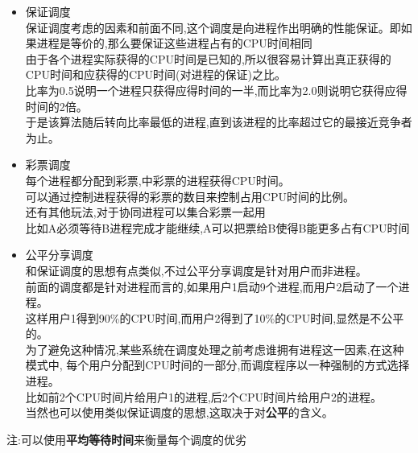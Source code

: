 \documentclass[UTF8,a4paper]{ctexart}
\begin{document}
\begin{itemize}
      \item 保证调度\\
      保证调度考虑的因素和前面不同,这个调度是向进程作出明确的性能保证。即如果进程是等价的,那么要保证这些进程占有的CPU时间相同\\
      由于各个进程实际获得的CPU时间是已知的,所以很容易计算出真正获得的CPU时间和应获得的CPU时间(对进程的保证)之比。\\
      比率为0.5说明一个进程只获得应得时间的一半,而比率为2.0则说明它获得应得时间的2倍。\\
      于是该算法随后转向比率最低的进程,直到该进程的比率超过它的最接近竞争者为止。

      \item 彩票调度\\
      每个进程都分配到彩票,中彩票的进程获得CPU时间。\\
      可以通过控制进程获得的彩票的数目来控制占用CPU时间的比例。\\
      还有其他玩法,对于协同进程可以集合彩票一起用\\
      比如A必须等待B进程完成才能继续,A可以把票给B使得B能更多占有CPU时间

      \item 公平分享调度\\
      和保证调度的思想有点类似,不过公平分享调度是针对用户而非进程。\\
      前面的调度都是针对进程而言的,如果用户1启动9个进程,而用户2启动了一个进程。\\
      这样用户1得到90\%的CPU时间,而用户2得到了10\%的CPU时间,显然是不公平的。\\
      为了避免这种情况,某些系统在调度处理之前考虑谁拥有进程这一因素,在这种模式中,
      每个用户分配到CPU时间的一部分,而调度程序以一种强制的方式选择进程。\\
      比如前2个CPU时间片给用户1的进程,后2个CPU时间片给用户2的进程。\\
      当然也可以使用类似保证调度的思想,这取决于对\textbf{公平}的含义。

    \end{itemize}

    注:可以使用\textbf{平均等待时间}来衡量每个调度的优劣
\end{document}
